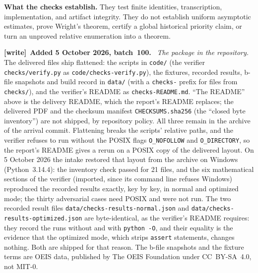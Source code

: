 \documentclass[11pt,letterpaper]{article}
\theoremstyle{remark}\newtheorem{remark}[theorem]{Remark}
\newenvironment{writenote}[1][]{\par\smallskip\begingroup\small
 \noindent\textbf{[write]}\if\relax\detokenize{#1}\relax\else~\textbf{#1.}\fi\ }%
 {\par\endgroup\smallskip}
\begin{document}
\textbf{What the checks establish.} They test finite identities, transcription, implementation, and artifact integrity. They do not establish uniform asymptotic estimates, prove Wright's theorem, certify a global historical priority claim, or turn an unproved relative enumeration into a theorem.

\begin{writenote}[Added 5 October 2026, batch~100]
\emph{The package in the repository.} The delivered files ship flattened:
the scripts in \nolinkurl{code/} (the verifier \nolinkurl{checks/verify.py} as
\nolinkurl{code/checks-verify.py}), the fixtures, recorded results, b-file
snapshots and build record in \nolinkurl{data/} (with a \nolinkurl{checks-}
prefix for files from \nolinkurl{checks/}), and the verifier's README as
\nolinkurl{checks-README.md}. ``The README'' above is the delivery README,
which the report's README replaces; the delivered PDF and the checksum
manifest \nolinkurl{CHECKSUMS.sha256} (the ``closed byte inventory'') are not
shipped, by repository policy. All three remain in the archive of the
arrival commit. Flattening breaks the scripts' relative paths, and the
verifier refuses to run without the POSIX flags \texttt{O\_NOFOLLOW} and
\texttt{O\_DIRECTORY}, so the report's README gives a rerun on a POSIX copy
of the delivered layout. On 5 October 2026 the intake restored that layout
from the archive on Windows (Python~3.14.4): the inventory check passed for
21 files, and the six mathematical sections of the verifier (imported, since
its command line refuses Windows) reproduced the recorded results exactly,
key by key, in normal and optimized mode; the thirty adversarial cases need
POSIX and were not run. The two recorded result files
\nolinkurl{data/checks-results-normal.json} and
\nolinkurl{data/checks-results-optimized.json} are byte-identical, as
the verifier's README requires: they record the runs without and with
\texttt{python -O}, and their equality is the evidence that the optimized
mode, which strips \texttt{assert} statements, changes nothing. Both are
shipped for that reason. The b-file snapshots and the fixture terms are OEIS
data, published by The OEIS Foundation under CC~BY-SA~4.0, not MIT-0.
\end{writenote}
\end{document}
